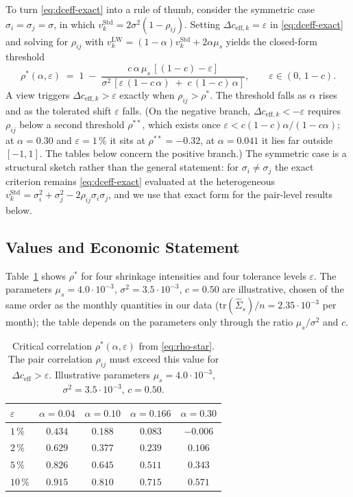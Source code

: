\documentclass[a4paper,11pt]{article}
\theoremstyle{plain}
\theoremstyle{definition}
\newcommand{\Std}{\mathrm{Std}}
\newcommand{\LW}{\mathrm{LW}}
\newcommand{\eff}{\mathrm{eff}}
\begin{document}
To turn \eqref{eq:dceff-exact} into a rule of thumb, consider the
symmetric case $\sigma_i = \sigma_j = \sigma$, in which
$v_k^\Std = 2\sigma^2(1 - \rho_{ij})$. Setting
$\Delta c_{\eff,k} = \varepsilon$ in \eqref{eq:dceff-exact} and solving
for $\rho_{ij}$ with $v_k^\LW = (1-\alpha)v_k^\Std + 2\alpha\mu_s$
yields the closed-form threshold
\begin{equation}
\label{eq:rho-star}
  \rho^*(\alpha,\varepsilon)
  \;=\;
  1 \;-\; \frac{c\,\alpha\,\mu_s\,[(1-c) - \varepsilon]}
              {\sigma^2\,[\varepsilon\,(1 - c\,\alpha) \;+\; c\,(1-c)\,\alpha]},
  \qquad \varepsilon \in (0,\,1-c).
\end{equation}
A view triggers $\Delta c_{\eff,k} > \varepsilon$ exactly when
$\rho_{ij} > \rho^*$. The threshold falls as $\alpha$ rises and as the
tolerated shift $\varepsilon$ falls. (On the negative branch,
$\Delta c_{\eff,k} < -\varepsilon$ requires $\rho_{ij}$ below a second
threshold $\rho^{**}$, which exists once
$\varepsilon < c(1-c)\alpha/(1-c\alpha)$; at $\alpha = 0.30$ and
$\varepsilon = 1\,\%$ it sits at $\rho^{**} = -0.32$, at
$\alpha = 0.041$ it lies far outside $[-1,1]$. The tables below concern
the positive branch.) The symmetric case is a structural
sketch rather than the general statement: for $\sigma_i \neq \sigma_j$
the exact criterion remains \eqref{eq:dceff-exact} evaluated at the
heterogeneous $v_k^\Std = \sigma_i^2 + \sigma_j^2 -
2\rho_{ij}\sigma_i\sigma_j$, and we use that exact form for the
pair-level results below.

\subsection{Values and Economic Statement}
\label{sec:values}

Table~\ref{tab:rho-star} shows $\rho^*$ for four shrinkage intensities
and four tolerance levels $\varepsilon$. The parameters $\mu_s = 4.0\cdot
10^{-3}$, $\sigma^2 = 3.5\cdot 10^{-3}$, $c = 0.50$ are illustrative,
chosen of the same order as the monthly quantities in our data
($\mathrm{tr}(\hat\Sigma_s)/n = 2.35\cdot 10^{-3}$ per month); the table
depends on the parameters only through the ratio $\mu_s/\sigma^2$
and $c$.

\begin{table}[H]
\centering
\caption{Critical correlation $\rho^*(\alpha,\varepsilon)$ from
\eqref{eq:rho-star}. The pair correlation $\rho_{ij}$ must exceed this
value for $\Delta c_{\eff} > \varepsilon$. Illustrative parameters
$\mu_s = 4.0\cdot 10^{-3}$, $\sigma^2 = 3.5\cdot 10^{-3}$, $c = 0.50$.}
\label{tab:rho-star}
\begin{tabular}{lcccc}
\toprule
$\varepsilon$ & $\alpha = 0.04$ & $\alpha = 0.10$ & $\alpha = 0.166$ & $\alpha = 0.30$ \\
\midrule
$1\,\%$  & $0.434$ & $0.188$ & $0.083$ & $-0.006$ \\
$2\,\%$  & $0.629$ & $0.377$ & $0.239$ & $0.106$ \\
$5\,\%$  & $0.826$ & $0.645$ & $0.511$ & $0.343$ \\
$10\,\%$ & $0.915$ & $0.810$ & $0.715$ & $0.571$ \\
\bottomrule
\end{tabular}
\end{table}
\end{document}
